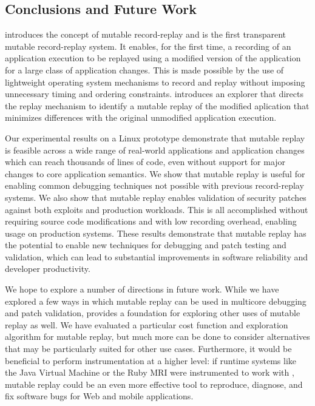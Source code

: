 \subsection{Conclusions and Future Work}
\label{sec:conclude}

{\dora} introduces the concept of mutable record-replay and is the
first transparent mutable record-replay system.  It enables, for the first time,
a recording of an application execution to be replayed
using a modified version of the application for a large class of
application changes.  This is made possible by the use of lightweight
operating system mechanisms to record and replay without imposing
unnecessary timing and ordering constraints.  {\dora} introduces an
explorer that directs the replay mechanism to identify a mutable
replay of the modified aplication that minimizes differences with the
original unmodified application execution.

Our experimental results on a Linux prototype demonstrate that mutable
replay is feasible across a wide range of real-world applications and
application changes which can reach thousands of lines of code, even
without support for major changes to core application semantics.  We
show that mutable replay is useful for enabling common debugging
techniques not possible with previous record-replay systems.  We
also show that mutable replay enables validation of security patches
against both exploits and production workloads. This is all
accomplished without requiring source code modifications and with low
recording overhead, enabling usage on production systems.  These
results demonstrate that mutable replay has the potential to enable
new techniques for debugging and patch testing and validation, which
can lead to substantial improvements in software reliability and developer
productivity.

We hope to explore a number of directions in future work.
While we have explored a few ways in which mutable replay can be used in
multicore debugging and patch validation, {\dora} provides a
foundation for exploring other uses of mutable replay as well.
We have evaluated a particular cost function and exploration
algorithm for mutable replay, but much more can be done to consider
alternatives that may be
particularly suited for other use cases.  Furthermore, it would be
beneficial to perform instrumentation at a higher level:
if runtime systems like the Java
Virtual Machine or the Ruby MRI were instrumented to work with
{\dora}, mutable replay could be an even more effective tool to
reproduce, diagnose, and fix software bugs for Web and mobile
applications.
